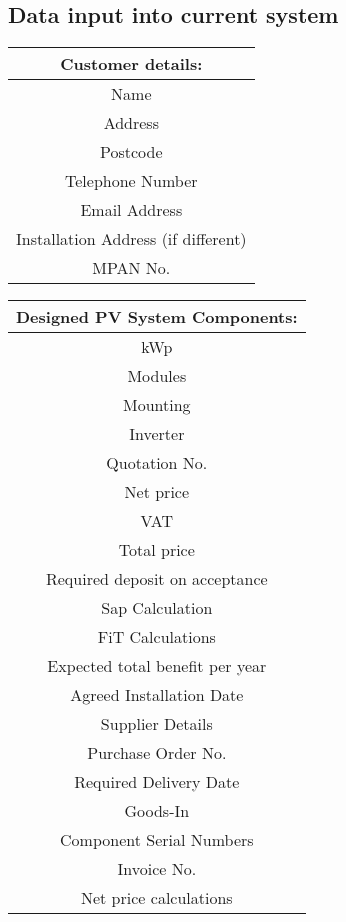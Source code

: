 \begin{appendices}
	\section{Data input into current system}
\begin{tabular}{ | c | }
	\hline
Customer details:\\
\hline
Name\\
Address\\
Postcode\\
Telephone Number\\
Email Address\\
Installation Address (if different)\\
MPAN No.\\
\hline
\end{tabular}
\begin{tabular}{ | c | }
\hline
Designed PV System Components:\\
\hline
kWp\\
Modules\\
Mounting\\
Inverter\\
\hline
Quotation No.\\
Net price\\
VAT\\ 
Total price\\
Required deposit on acceptance\\
Sap Calculation\\
FiT Calculations\\
Expected total benefit per year\\
Agreed Installation Date\\
Supplier Details\\
Purchase Order No.\\
Required Delivery Date\\
Goods-In\\
Component Serial Numbers\\
Invoice No.\\
Net price calculations\\
\hline
\end{tabular}

\end{appendices}
